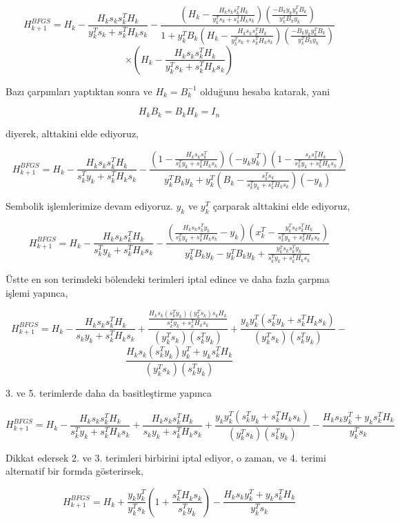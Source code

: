 \documentclass[12pt,fleqn]{article}\usepackage{../../common}
\begin{document}
$$
H_{k+1}^{BFGS} = H_k - \frac{H_ks_ks_k^TH_k}{y_k^Ts_k + s_k^TH_ks_k} -
\frac
  {(H_k - \frac{H_ks_ks_k^TH_k}{y_k^Ts_k + s_k^TH_ks_k})
    (\frac{-B_k y_ky_k^TB_k}{y_k^TB_ky_k}) 
  }
  {1+y_k^TB_k (H_k - \frac{H_ks_ks_k^TH_k}{y_k^Ts_k + s_k^TH_ks_k})(\frac{-B_k y_ky_k^TB_k}{y_k^TB_ky_k})}
$$
$$
\times (H_k - \frac{H_ks_ks_k^TH_k}{y_k^Ts_k + s_k^TH_ks_k})
$$

Bazı çarpımları yaptıktan sonra ve $H_k = B_k^{-1}$ olduğunu hesaba
katarak, yani

$$
H_kB_k = B_kH_k=I_n
$$

diyerek, alttakini elde ediyoruz,

$$
H_{k+1}^{BFGS} = H_k - \frac{H_ks_ks_k^TH_k}{s_k^Ty_k + s_k^TH_ks_k} -
\frac
{ 
  (1 - \frac{H_k s_ks_k^T}{s_k^T y_k + s_k^TH_ks_k})
  (-y_ky_k^T)
  (1 - \frac{s_ks_k^TH_k}{s_k^Ty_k + s_k^TH_ks_k})
}
{y_k^T B_k y_k + y_k^T (B_k - \frac{s_k^Ts_k}{s_k^Ty_k + s_k^TH_ks_k})(-y_k)  }
$$

Sembolik işlemlerimize devam ediyoruz. $y_k$ ve $y_k^T$ çarparak alttakini
elde ediyoruz, 

$$
H_{k+1}^{BFGS} =  H_k - \frac{H_ks_ks_k^TH_k}{s_k^Ty_k + s_k^TH_ks_k} - 
\frac
{ 
  (\frac{H_k s_ks_k^Ty_k}{s_k^T y_k + s_k^TH_ks_k} - y_k)
  (x_k^T - \frac{y_k^T s_ks_k^TH_k}{s_k^Ty_k + s_k^TH_ks_k})
}
{
y_k^TB_ky_k - y_k^T B_k y_k + 
\frac{y_k^T s_ks_k^Ty_k}{s_k^Ty_k + s_k^TH_ks_k}
}
$$

Üstte en son terimdeki bölendeki terimleri iptal edince ve daha fazla
çarpma işlemi yapınca,

$$
H_{k+1}^{BFGS} =  H_k - 
\frac{H_ks_ks_k^TH_k}{s_ky_k + s_k^TH_ks_k} +
\frac
   {\frac{H_k s_k(s_k^T y_k) (y_k^T s_k)s_k H_k }{s_k^T y_k + s_k^T H_k s_k}}
   {(y_k^T s_k)(s_k^T y_k)} +
\frac
   {y_k y_k^T (s_k^T y_k + s_k^T H_k s_k) }
   {(y_k^T s_k)(s_k^T y_k)} - 
$$
$$
\frac
   {H_k s_k (s_k^T y_k) y_k^T + y_k s_k^T H_k  }
   {(y_k^T s_k)(s_k^Ty_k)}
$$

3. ve 5. terimlerde daha da basitleştirme yapınca

$$
H_{k+1}^{BFGS} =  
H_k - \frac{H_k s_k s_k^T H_k}{s_k^T y_k + s_k^T H_k s_k} +
\frac{H_k s_k s_k^T H_k}{s_k y_k + s_k^T H_k s_k} +
\frac{y_k y_k^T (s_k^T y_k + s_k^T H_k s_k)}{(y_k^T s_k)(s_k^Ty_k)} - 
\frac{H_k s_k y_k^T + y_ks_k^T H_k}{y_k^T s_k}
$$

Dikkat edersek 2. ve 3. terimleri birbirini iptal ediyor, o zaman, ve
4. terimi alternatif bir formda gösterirsek,

$$
H_{k+1}^{BFGS} =  H_k + 
\frac{y_k y_k^T}{y_k^T s_k} \left( 1 + \frac{s_k^T H_k s_k}{s_k^T y_k}  \right) - 
\frac{H_k s_k y_k^T + y_k s_k^T H_k}{y_k^T s_k}
$$
\end{document}
